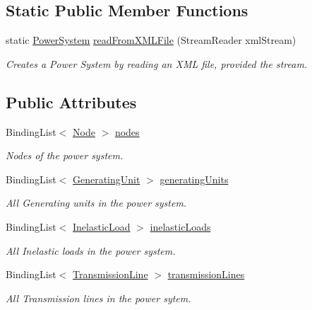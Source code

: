 \subsection*{Static Public Member Functions}
\begin{DoxyCompactItemize}
\item 
static \hyperlink{class_power_system_planning_1_1_power_system}{Power\+System} \hyperlink{class_power_system_planning_1_1_power_system_ad61746fe7b02b94761abec0f022d106a}{read\+From\+X\+M\+L\+File} (Stream\+Reader xml\+Stream)
\begin{DoxyCompactList}\small\item\em Creates a Power System by reading an X\+ML file, provided the stream. \end{DoxyCompactList}\end{DoxyCompactItemize}
\subsection*{Public Attributes}
\begin{DoxyCompactItemize}
\item 
Binding\+List$<$ \hyperlink{class_power_system_planning_1_1_node}{Node} $>$ \hyperlink{class_power_system_planning_1_1_power_system_aa5709bbb488708bcb162646585f01c79}{nodes}
\begin{DoxyCompactList}\small\item\em Nodes of the power system. \end{DoxyCompactList}\item 
Binding\+List$<$ \hyperlink{class_power_system_planning_1_1_generating_unit}{Generating\+Unit} $>$ \hyperlink{class_power_system_planning_1_1_power_system_a899692153e8c860b54745c503f8af765}{generating\+Units}
\begin{DoxyCompactList}\small\item\em All Generating units in the power system. \end{DoxyCompactList}\item 
Binding\+List$<$ \hyperlink{class_power_system_planning_1_1_inelastic_load}{Inelastic\+Load} $>$ \hyperlink{class_power_system_planning_1_1_power_system_a0445fbb84b2deb936cfc1b7b38d8f5ed}{inelastic\+Loads}
\begin{DoxyCompactList}\small\item\em All Inelastic loads in the power system. \end{DoxyCompactList}\item 
Binding\+List$<$ \hyperlink{class_power_system_planning_1_1_transmission_line}{Transmission\+Line} $>$ \hyperlink{class_power_system_planning_1_1_power_system_a1394f9c3a23efcc0cd93acb46611c102}{transmission\+Lines}
\begin{DoxyCompactList}\small\item\em All Transmission lines in the power sytem. \end{DoxyCompactList}\end{DoxyCompactItemize}
